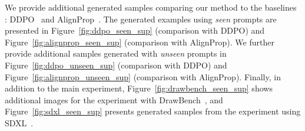 We provide additional generated samples comparing our  method to the baselines : DDPO~\cite{ddpo} and AlignProp~\cite{alignprop}. The generated examples using \textit{seen} prompts are presented in Figure~\ref{fig:ddpo_seen_sup} (comparison with DDPO) and Figure~\ref{fig:alignprop_seen_sup} (comparison with AlignProp). We further provide additional samples generated with \textit{unseen} prompts in Figure~\ref{fig:ddpo_unseen_sup} (comparison with DDPO) and Figure~\ref{fig:alignprop_unseen_sup} (comparison with AlignProp).
Finally, in addition to the main experiment, Figure~\ref{fig:drawbench_seen_sup} shows additional images for the experiment with DrawBench~\cite{imagen}, and Figure~\ref{fig:sdxl_seen_sup} presents generated samples from the experiment using SDXL~\cite{sdxl}.